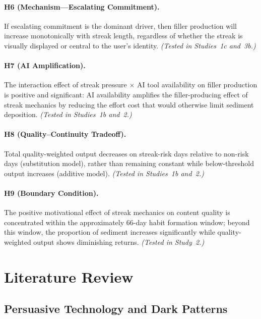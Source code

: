\documentclass[12pt]{article}
\begin{document}
\paragraph{H6 (Mechanism---Escalating Commitment).} If escalating commitment is the dominant driver, then filler production will increase monotonically with streak length, regardless of whether the streak is visually displayed or central to the user's identity. \textit{(Tested in Studies~1c and~3b.)}

\paragraph{H7 (AI Amplification).} The interaction effect of streak pressure $\times$ AI tool availability on filler production is positive and significant: AI availability amplifies the filler-producing effect of streak mechanics by reducing the effort cost that would otherwise limit sediment deposition. \textit{(Tested in Studies~1b and~2.)}

\paragraph{H8 (Quality--Continuity Tradeoff).} Total quality-weighted output decreases on streak-risk days relative to non-risk days (substitution model), rather than remaining constant while below-threshold output increases (additive model). \textit{(Tested in Studies~1b and~2.)}

\paragraph{H9 (Boundary Condition).} The positive motivational effect of streak mechanics on content quality is concentrated within the approximately 66-day habit formation window; beyond this window, the proportion of sediment increases significantly while quality-weighted output shows diminishing returns. \textit{(Tested in Study~2.)}

\section{Literature Review}
\label{sec:literature-review}

\subsection{Persuasive Technology and Dark Patterns}
\label{sec:lit-persuasive-tech}
\end{document}
